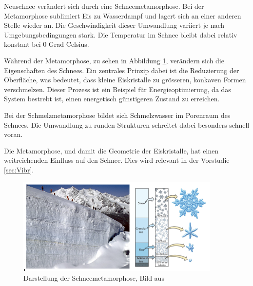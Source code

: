 Neuschnee verändert sich durch eine Schneemetamorphose. Bei der Metamorphose sublimiert Eis zu Wasserdampf und lagert sich an einer anderen Stelle wieder an. Die Geschwindigkeit dieser Umwandlung variiert je nach Umgebungsbedingungen stark. Die Temperatur im Schnee bleibt dabei relativ konstant bei 0 Grad Celsius.


Während der Metamorphose, zu sehen in Abbildung \ref{fig:Metha}, verändern sich die Eigenschaften des Schnees. Ein zentrales Prinzip dabei ist die Reduzierung der Oberfläche, was bedeutet, dass kleine Eiskristalle zu grösseren, konkaven Formen verschmelzen. Dieser Prozess ist ein Beispiel für Energieoptimierung, da das System bestrebt ist, einen energetisch günstigeren Zustand zu erreichen.

Bei der Schmelzmetamorphose bildet sich Schmelzwasser im Porenraum des Schnees. Die Umwandlung zu runden Strukturen schreitet dabei besonders schnell voran. \cite{WSLSLFMetha.2024}

Die Metamorphose, und damit die Geometrie der Eiskristalle, hat einen weitreichenden Einfluss auf den Schnee. Dies wird relevant in der Vorstudie \ref{sec:Vibr}.

\begin{figure}[H]
    \centering
    \includegraphics[width=0.9\textwidth]{Bilder/gletscher_eis_schnee.png}
    \caption{Darstellung der Schneemetamorphose, Bild aus \cite{Wetterdienst.6222017}}
    \label{fig:Metha}
\end{figure}
